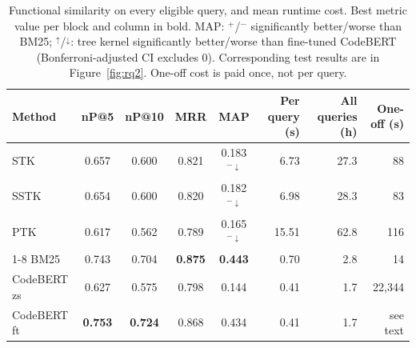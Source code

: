 \begin{table}[!htbp]
\centering
\caption{Functional similarity on every eligible query, and mean runtime cost. Best metric value per block and column in bold. MAP: $^{+}$/$^{-}$ significantly better/worse than BM25; $^{\uparrow}$/$^{\downarrow}$: tree kernel significantly better/worse than fine-tuned CodeBERT (Bonferroni-adjusted CI excludes 0). Corresponding test results are in Figure~\ref{fig:rq2}. One-off cost is paid once, not per query.}
\label{tab:rq2}
\footnotesize
\setlength{\tabcolsep}{4pt}
\begin{tabular}{lcccc||rrr}
\toprule
Method & nP@5 & nP@10 & MRR & MAP & Per query (s) & All queries (h) & One-off (s) \\
\midrule
STK & 0.657 & 0.600 & 0.821 & 0.183$^{-\downarrow}$ & 6.73 & 27.3 & 88 \\
SSTK & 0.654 & 0.600 & 0.820 & 0.182$^{-\downarrow}$ & 6.98 & 28.3 & 83 \\
PTK & 0.617 & 0.562 & 0.789 & 0.165$^{-\downarrow}$ & 15.51 & 62.8 & 116 \\
\cmidrule(lr){1-8}
BM25 & 0.743 & 0.704 & \textbf{0.875} & \textbf{0.443} & 0.70 & 2.8 & 14 \\
CodeBERT zs & 0.627 & 0.575 & 0.798 & 0.144 & 0.41 & 1.7 & 22,344 \\
CodeBERT ft & \textbf{0.753} & \textbf{0.724} & 0.868 & 0.434 & 0.41 & 1.7 & see text \\
\bottomrule
\end{tabular}
\end{table}

